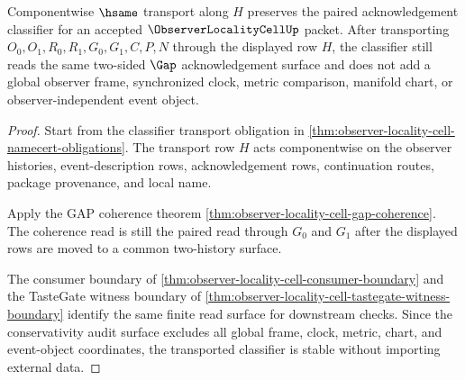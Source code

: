 \begin{theorem}
\label{thm:observer-locality-cell-obligation-classifier-stability}
Componentwise $\hsame$ transport along $H$ preserves the paired acknowledgement classifier for an accepted $\ObserverLocalityCellUp$ packet. After transporting $O_0,O_1,R_0,R_1,G_0,G_1,C,P,N$ through the displayed row $H$, the classifier still reads the same two-sided $\Gap$ acknowledgement surface and does not add a global observer frame, synchronized clock, metric comparison, manifold chart, or observer-independent event object.
\end{theorem}
\begin{proof}
Start from the classifier transport obligation in \autoref{thm:observer-locality-cell-namecert-obligations}. The transport row $H$ acts componentwise on the observer histories, event-description rows, acknowledgement rows, continuation routes, package provenance, and local name.

Apply the GAP coherence theorem \autoref{thm:observer-locality-cell-gap-coherence}. The coherence read is still the paired read through $G_0$ and $G_1$ after the displayed rows are moved to a common two-history surface.

The consumer boundary of \autoref{thm:observer-locality-cell-consumer-boundary} and the TasteGate witness boundary of \autoref{thm:observer-locality-cell-tastegate-witness-boundary} identify the same finite read surface for downstream checks. Since the conservativity audit surface excludes all global frame, clock, metric, chart, and event-object coordinates, the transported classifier is stable without importing external data.
\end{proof}

